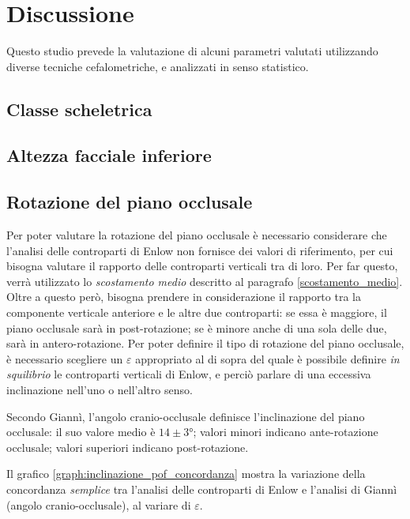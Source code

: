 \chapter{Discussione}
Questo studio prevede la valutazione di alcuni parametri valutati utilizzando diverse tecniche cefalometriche, e analizzati in senso statistico.

\section{Classe scheletrica}

\section{Altezza facciale inferiore}

\section{Rotazione del piano occlusale}
Per poter valutare la rotazione del piano occlusale è necessario considerare che l'analisi delle controparti di Enlow non fornisce dei valori di riferimento, per cui bisogna valutare il rapporto delle controparti verticali tra di loro. Per far questo, verrà utilizzato lo \emph{scostamento medio} descritto al paragrafo \vref{scostamento_medio}. Oltre a questo però, bisogna prendere in considerazione il rapporto tra la componente verticale anteriore e le altre due controparti: se essa è maggiore, il piano occlusale sarà in post-rotazione; se è minore anche di una sola delle due, sarà in antero-rotazione. Per poter definire il tipo di rotazione del piano occlusale, è necessario scegliere un $\varepsilon$ appropriato al di sopra del quale è possibile definire \emph{in squilibrio} le controparti verticali di Enlow, e perciò parlare di una eccessiva inclinazione nell'uno o nell'altro senso.

Secondo Giannì, l'angolo cranio-occlusale definisce l'inclinazione del piano occlusale: il suo valore medio è $14 \pm 3°$; valori minori indicano ante-rotazione occlusale; valori superiori indicano post-rotazione.

Il grafico \vref{graph:inclinazione_pof_concordanza} mostra la variazione della concordanza \emph{semplice} tra l'analisi delle controparti di Enlow e l'analisi di Giannì (angolo cranio-occlusale), al variare di $\varepsilon$.

